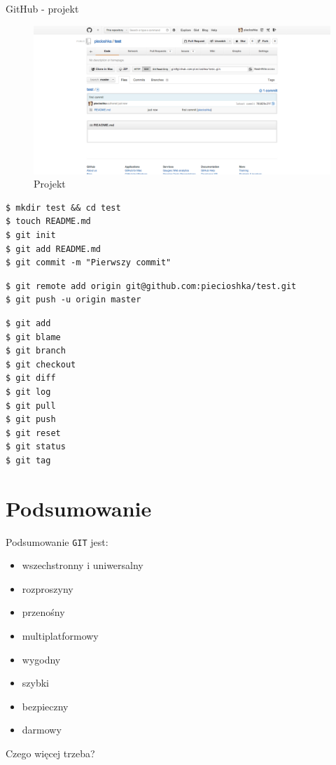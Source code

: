 \documentclass{beamer}
\begin{document}
\begin{frame}{GitHub - projekt}
  \begin{figure}
  \includegraphics[width=\textwidth]{photos/project.png}
  \caption{\label{fig:project}Projekt}
  \end{figure}
\end{frame}

\begin{framed}
\begin{lstlisting}[frame=none, caption=Praca lokalna]
$ mkdir test && cd test
$ touch README.md
$ git init
$ git add README.md
$ git commit -m "Pierwszy commit"
\end{lstlisting}
\end{framed}

\begin{framed}
\begin{lstlisting}[frame=none, caption=Praca zdalna]
$ git remote add origin git@github.com:piecioshka/test.git
$ git push -u origin master
\end{lstlisting}
\end{framed}

\begin{framed}
\begin{lstlisting}[frame=none, caption=Najpopularniejsze polecenia]
$ git add
$ git blame
$ git branch
$ git checkout
$ git diff
$ git log
$ git pull
$ git push
$ git reset
$ git status
$ git tag
\end{lstlisting}
\end{framed}


\section{Podsumowanie}

\begin{frame}{Podsumowanie}
\texttt{GIT} jest:
\begin{itemize}
  \item wszechstronny i uniwersalny
  \item rozproszyny
  \item przenośny
  \item multiplatformowy
  \item wygodny
  \item szybki
  \item bezpieczny
  \item darmowy
\end{itemize}
\vskip 1cm
Czego więcej trzeba?
\end{frame}
\end{document}
